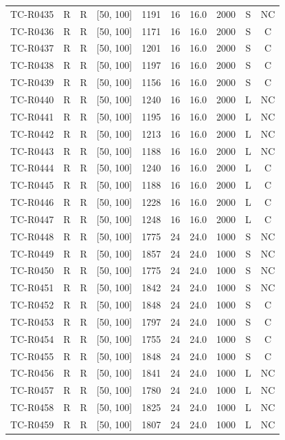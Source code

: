 \begin{longtable}{lccccccccc}
TC-R0435 & R & R & [50, 100] & 1191 & 16 & 16.0 & 2000 & S & NC \\
TC-R0436 & R & R & [50, 100] & 1171 & 16 & 16.0 & 2000 & S & C \\
TC-R0437 & R & R & [50, 100] & 1201 & 16 & 16.0 & 2000 & S & C \\
TC-R0438 & R & R & [50, 100] & 1197 & 16 & 16.0 & 2000 & S & C \\
TC-R0439 & R & R & [50, 100] & 1156 & 16 & 16.0 & 2000 & S & C \\
TC-R0440 & R & R & [50, 100] & 1240 & 16 & 16.0 & 2000 & L & NC \\
TC-R0441 & R & R & [50, 100] & 1195 & 16 & 16.0 & 2000 & L & NC \\
TC-R0442 & R & R & [50, 100] & 1213 & 16 & 16.0 & 2000 & L & NC \\
TC-R0443 & R & R & [50, 100] & 1188 & 16 & 16.0 & 2000 & L & NC \\
TC-R0444 & R & R & [50, 100] & 1240 & 16 & 16.0 & 2000 & L & C \\
TC-R0445 & R & R & [50, 100] & 1188 & 16 & 16.0 & 2000 & L & C \\
TC-R0446 & R & R & [50, 100] & 1228 & 16 & 16.0 & 2000 & L & C \\
TC-R0447 & R & R & [50, 100] & 1248 & 16 & 16.0 & 2000 & L & C \\
TC-R0448 & R & R & [50, 100] & 1775 & 24 & 24.0 & 1000 & S & NC \\
TC-R0449 & R & R & [50, 100] & 1857 & 24 & 24.0 & 1000 & S & NC \\
TC-R0450 & R & R & [50, 100] & 1775 & 24 & 24.0 & 1000 & S & NC \\
TC-R0451 & R & R & [50, 100] & 1842 & 24 & 24.0 & 1000 & S & NC \\
TC-R0452 & R & R & [50, 100] & 1848 & 24 & 24.0 & 1000 & S & C \\
TC-R0453 & R & R & [50, 100] & 1797 & 24 & 24.0 & 1000 & S & C \\
TC-R0454 & R & R & [50, 100] & 1755 & 24 & 24.0 & 1000 & S & C \\
TC-R0455 & R & R & [50, 100] & 1848 & 24 & 24.0 & 1000 & S & C \\
TC-R0456 & R & R & [50, 100] & 1841 & 24 & 24.0 & 1000 & L & NC \\
TC-R0457 & R & R & [50, 100] & 1780 & 24 & 24.0 & 1000 & L & NC \\
TC-R0458 & R & R & [50, 100] & 1825 & 24 & 24.0 & 1000 & L & NC \\
TC-R0459 & R & R & [50, 100] & 1807 & 24 & 24.0 & 1000 & L & NC \\

\end{longtable}
